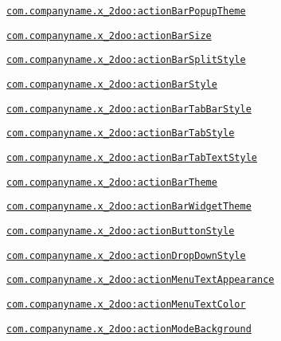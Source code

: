 {\tt \hyperlink{classandroid_1_1support_1_1v4_1_1_r_1_1styleable_b8e3e3d79004f9d863d1f02f888e17e8}{com.companyname.x\_\-2doo:actionBarPopupTheme}}

{\tt \hyperlink{classandroid_1_1support_1_1v4_1_1_r_1_1styleable_ee6703791177fb18457f6fa90659aad3}{com.companyname.x\_\-2doo:actionBarSize}}

{\tt \hyperlink{classandroid_1_1support_1_1v4_1_1_r_1_1styleable_45e5a64b1e5eae0d6bd7742eb43a7c56}{com.companyname.x\_\-2doo:actionBarSplitStyle}}

{\tt \hyperlink{classandroid_1_1support_1_1v4_1_1_r_1_1styleable_c3f864960381c66a243e748e86583219}{com.companyname.x\_\-2doo:actionBarStyle}}

{\tt \hyperlink{classandroid_1_1support_1_1v4_1_1_r_1_1styleable_f88289a95a6edd4e037e864093455f6a}{com.companyname.x\_\-2doo:actionBarTabBarStyle}}

{\tt \hyperlink{classandroid_1_1support_1_1v4_1_1_r_1_1styleable_d41958baadf80c6e15b8c8c98ee941f2}{com.companyname.x\_\-2doo:actionBarTabStyle}}

{\tt \hyperlink{classandroid_1_1support_1_1v4_1_1_r_1_1styleable_638a87bf99ca4d6078c162044ec4dbbc}{com.companyname.x\_\-2doo:actionBarTabTextStyle}}

{\tt \hyperlink{classandroid_1_1support_1_1v4_1_1_r_1_1styleable_2b2e4f39df58cecdc1b9bf54757c7e22}{com.companyname.x\_\-2doo:actionBarTheme}}

{\tt \hyperlink{classandroid_1_1support_1_1v4_1_1_r_1_1styleable_1e7154e75762f816225eec7fd9d1ca7b}{com.companyname.x\_\-2doo:actionBarWidgetTheme}}

{\tt \hyperlink{classandroid_1_1support_1_1v4_1_1_r_1_1styleable_4a5b2d32e9dd1e13e612b6d13ac23006}{com.companyname.x\_\-2doo:actionButtonStyle}}

{\tt \hyperlink{classandroid_1_1support_1_1v4_1_1_r_1_1styleable_cea968e94c1465c9f1c390fe9de9567c}{com.companyname.x\_\-2doo:actionDropDownStyle}}

{\tt \hyperlink{classandroid_1_1support_1_1v4_1_1_r_1_1styleable_5430afc19e0b78b7dc7aee394d785df7}{com.companyname.x\_\-2doo:actionMenuTextAppearance}}

{\tt \hyperlink{classandroid_1_1support_1_1v4_1_1_r_1_1styleable_7c5193ab46252c56ec1b49d531de7e9d}{com.companyname.x\_\-2doo:actionMenuTextColor}}

{\tt \hyperlink{classandroid_1_1support_1_1v4_1_1_r_1_1styleable_f70d7a35bb0b3c72eebdf5c561070a1d}{com.companyname.x\_\-2doo:actionModeBackground}}

